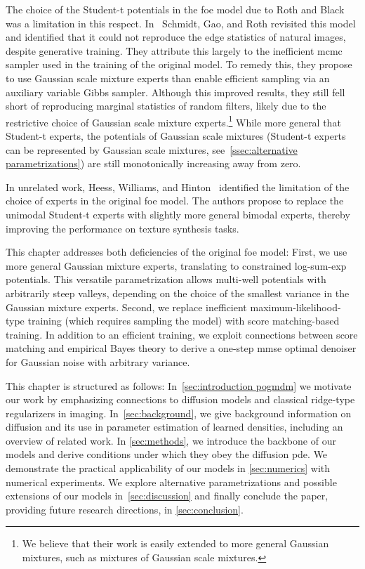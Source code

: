 The choice of the Student-t potentials in the \gls{foe} model due to Roth and Black~\cite{RoBl09} was a limitation in this respect.
In~\cite{schmidt_generative_2010} Schmidt, Gao, and Roth revisited this model and identified that it could not reproduce the edge statistics of natural images, despite generative training.
They attribute this largely to the inefficient \gls{mcmc} sampler used in the training of the original model.
To remedy this, they propose to use Gaussian scale mixture experts than enable efficient sampling via an auxiliary variable Gibbs sampler.
Although this improved results, they still fell short of reproducing marginal statistics of random filters, likely due to the restrictive choice of Gaussian scale mixture experts.\footnote{%
	We believe that their work is easily extended to more general Gaussian mixtures, such as mixtures of Gaussian scale mixtures.
}
While more general that Student-t experts, the potentials of Gaussian scale mixtures (Student-t experts can be represented by Gaussian scale mixtures, see~\cref{ssec:alternative parametrizations}) are still monotonically increasing away from zero.

In unrelated work, Heess, Williams, and Hinton~\cite{heess_learning_2009} identified the limitation of the choice of experts in the original \gls{foe} model.
The authors propose to replace the unimodal Student-t experts with slightly more general bimodal experts, thereby improving the performance on texture synthesis tasks.

This chapter addresses both deficiencies of the original \gls{foe} model:
First, we use more general Gaussian mixture experts, translating to constrained log-sum-exp potentials.
This versatile parametrization allows  multi-well potentials with arbitrarily steep valleys, depending on the choice of the smallest variance in the Gaussian mixture experts.
Second, we replace inefficient maximum-likelihood-type training (which requires sampling the model) with score matching-based training.
In addition to an efficient training, we exploit connections between score matching and empirical Bayes theory to derive a one-step \gls{mmse} optimal denoiser for Gaussian noise with arbitrary variance.

This chapter is structured as follows:
In~\cref{sec:introduction pogmdm} we motivate our work by emphasizing connections to diffusion models and classical ridge-type regularizers in imaging.
In~\cref{sec:background}, we give background information on diffusion and its use in parameter estimation of learned densities, including an overview of related work.
In \cref{sec:methods}, we introduce the backbone of our models and derive conditions under which they obey the diffusion \gls{pde}.
We demonstrate the practical applicability of our models in \cref{sec:numerics} with numerical experiments.
We explore alternative parametrizations and possible extensions of our models in~\cref{sec:discussion} and finally conclude the paper, providing future research directions, in \cref{sec:conclusion}.

